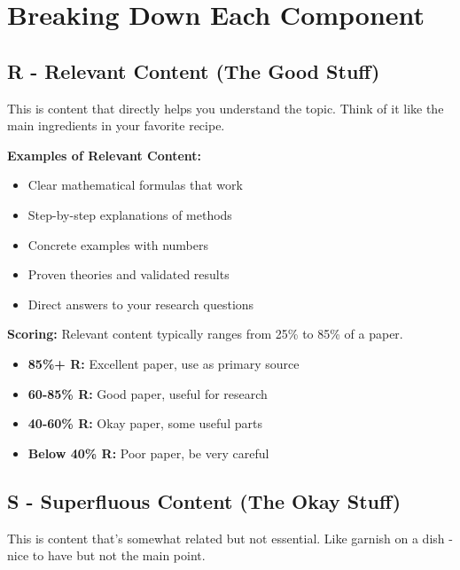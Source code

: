 \documentclass[11pt,a4paper]{article}
\begin{document}
\section{Breaking Down Each Component}

\subsection{R - Relevant Content (The Good Stuff)}

\begin{tcolorbox}[colback=successgreen!10,colframe=successgreen,title=What is Relevant Content?]
This is content that directly helps you understand the topic. Think of it like the main ingredients in your favorite recipe.
\end{tcolorbox}

\textbf{Examples of Relevant Content:}
\begin{itemize}[leftmargin=*]
\item Clear mathematical formulas that work
\item Step-by-step explanations of methods  
\item Concrete examples with numbers
\item Proven theories and validated results
\item Direct answers to your research questions
\end{itemize}

\textbf{Scoring:} Relevant content typically ranges from 25\% to 85\% of a paper.
\begin{itemize}
\item \textbf{85\%+ R:} Excellent paper, use as primary source
\item \textbf{60-85\% R:} Good paper, useful for research
\item \textbf{40-60\% R:} Okay paper, some useful parts
\item \textbf{Below 40\% R:} Poor paper, be very careful
\end{itemize}

\subsection{S - Superfluous Content (The Okay Stuff)}

\begin{tcolorbox}[colback=orange!10,colframe=orange,title=What is Superfluous Content?]
This is content that's somewhat related but not essential. Like garnish on a dish - nice to have but not the main point.
\end{tcolorbox}
\end{document}
